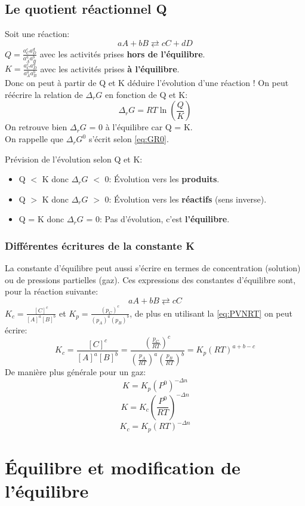 \documentclass[10pt,a4paper]{book}
\begin{document}
\subsection{Le quotient réactionnel Q}
Soit une réaction:
\[aA + bB \rightleftarrows cC + dD\]
\(Q = \frac{a_C^c a_D^d}{a_A^a a_B^b}\) avec les activités prises \textbf{hors de l'équilibre}. \\
\(K = \frac{a_C^c a_D^d}{a_A^a a_B^b}\) avec les activités prises \textbf{à l'équilibre}. \\
Donc on peut à partir de Q et K déduire l'évolution d'une réaction ! On peut réécrire la relation de $\Delta_rG$ en fonction de Q et K: 
\[\Delta_rG = RT\ln(\frac{Q}{K})\]
On retrouve bien $\Delta_rG$ = 0 à l'équilibre car Q = K. \\
On rappelle que $\Delta_rG^0$ s'écrit selon \ref{eq:GR0}. \\ \par
Prévision de l'évolution selon Q et K:
\begin{itemize}
\item Q $<$ K donc $\Delta_rG$ $<$ 0: Évolution vers les \textbf{produits}.
\item Q $>$ K donc $\Delta_rG$ $>$ 0: Évolution vers les \textbf{réactifs} (sens inverse).
\item Q = K donc $\Delta_rG$ = 0: Pas d'évolution, c'est \textbf{l'équilibre}.
\end{itemize}

\subsubsection{Différentes écritures de la constante K}

La constante d’équilibre peut aussi s’écrire en termes de concentration (solution) ou de
pressions partielles (gaz). Ces expressions des constantes d’équilibre sont, pour la réaction suivante: 
\[aA + bB \rightleftarrows cC\]
\(K_c = \frac{[C]^c}{[A]^a[B]^b}\) et \(K_p = \frac{(p_C)^c}{(p_A)^a(p_B)^b}\), de plus en utilisant la \ref{eq:PVNRT} on peut écrire:
\[K_c = \frac{[C]^c}{[A]^a[B]^b} = \frac{(\frac{p_C}{RT})^c}{(\frac{p_A}{RT})^a(\frac{p_B}{RT})^b} = K_p(RT)^{a+b-c}\]
De manière plus générale pour un gaz:
\[K = K_p(P^0)^{-\Delta n}\]
\[K = K_c(\frac{P^0}{RT})^{-\Delta n}\]
\[K_c = K_p(RT)^{-\Delta n}\]

\section{Équilibre et modification de l'équilibre}
\end{document}
